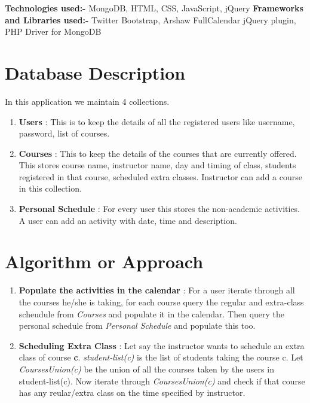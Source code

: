 \documentclass[twocolumn]{article}
\newcommand{\comment}[1]{}
\begin{document}
\textbf{Technologies used:-} MongoDB, HTML, CSS, JavaScript, jQuery
\newline
\textbf{Frameworks and Libraries used:-} Twitter Bootstrap, Arshaw FullCalendar jQuery plugin, PHP Driver for MongoDB
\comment{

Can also comment out paragraphs, etc.

}
\section{Database Description}
In this application we maintain 4 collections. 

\begin{enumerate}
  \item \textbf{Users} : This is to keep the details of all the registered users like username, password, list of courses.
  \item \textbf{Courses} : This to keep the details of the courses that are currently offered. This stores course name, instructor name, day and timing of class, students registered in that course, scheduled extra classes. Instructor can add a course in this collection.
  \item \textbf{Personal Schedule} : For every user this stores the non-academic activities. A user can add an activity with date, time and description.

\end{enumerate}

\section{Algorithm or Approach}
\begin{enumerate}
\item \textbf{Populate the activities in the calendar} : For a user iterate through all the courses he/she is taking, for each course query the regular and extra-class scheudule from \emph{Courses} and populate it in the calendar. Then query the personal schedule from \emph{Personal Schedule} and populate this too.  
\item \textbf{Scheduling Extra Class} : Let say the instructor wants to schedule an extra class of course \textbf{c}. \emph{student-list(c)} is the list of students taking the course c. Let \emph{CoursesUnion(c)} be the union of all the courses taken by the users in student-list(c). Now iterate through \emph{CoursesUnion(c)}  and check if that course has any reular/extra class on the time specified by instructor.\\

\end{enumerate}
\end{document}
